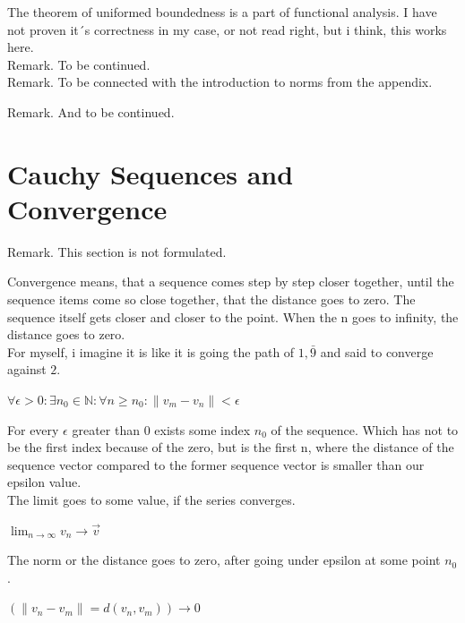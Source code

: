 \documentclass[a4paper]{article}
\begin{document}
The theorem of uniformed boundedness is a part of functional analysis. I have not proven it´s correctness in my case, or not read right, but i think, this works here.\\

Remark. To be continued.\\

Remark. To be connected with the introduction to norms from the appendix.

Remark. And to be continued.\\

\section{Cauchy Sequences and Convergence}

Remark. This section is not formulated.

Convergence means, that a sequence comes step by step closer together, until the sequence items come so close together, that the distance goes to zero. The sequence itself gets closer and closer to the point. When the n goes to infinity, the distance goes to zero.\\

For myself, i imagine it is like it is going the path of $1,\bar{9}$ and said to converge against $2$.\\

\begin{center}
$\forall \epsilon > 0 : \exists n_{0} \in \mathbb{N} : \forall n \geq n_{0} : \|v_{m}-v_{n}\| \less \epsilon$
\end{center}

For every $\epsilon$ greater than 0 exists some index $n_{0}$ of the sequence. Which has not to be the first index because of the zero,
but is the first n, where the distance of the sequence vector compared to the former sequence vector is smaller than our epsilon value.\\

The limit goes to some value, if the series converges.\\

\begin{center}
$\lim\nolimits_{n\rightarrow\infty} v_{n} \rightarrow \vec{v}$\\
\end{center}

The norm or the distance goes to zero, after going under epsilon at some point $n_{0}$.

\begin{center}
$(\|v_{n}-v_{m}\| = d(v_{n},v_{m})) \rightarrow 0$
\end{center}
\end{document}
